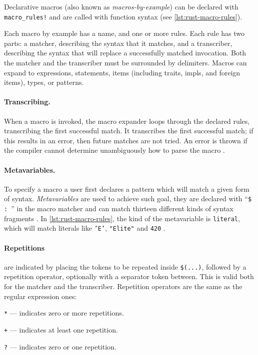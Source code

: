 Declarative macros (also known as \emph{macros-by-example}) can be declared with \texttt{macro\_rules!}
and are called with function syntax (see \autoref{lst:rust-macro-rules}).

\begin{displayquote}
	Each macro by example has a name, and one or more rules.
	Each rule has two parts: a matcher, describing the syntax that it matches, and a transcriber,
	describing the syntax that will replace a successfully matched invocation.
	Both the matcher and the transcriber must be surrounded by delimiters.
	Macros can expand to expressions, statements, items
	(including traits, impls, and foreign items), types, or patterns.
\end{displayquote}

\paragraph{Transcribing.}
When a macro is invoked, the macro expander loops through the declared rules, transcribing the first successful match.
It transcribes the first successful match; if this results in an error, then future matches are not tried.
An error is thrown if the compiler cannot determine unambiguously how to parse the macro
\autocite[Section 3.1 - Transcribing]{RustRef2021}.

\paragraph{Metavariables.}
To specify a macro a user first declares a pattern which will match a given form of syntax.
\emph{Metavariables} are used to achieve such goal,
they are declared with “\texttt{\$  : }” in the macro matcher and
can match thirteen different kinds of syntax fragments \autocite[Section 3.1 - Metavariables]{RustRef2021}.
In \autoref{lst:rust-macro-rules}, the kind of the  metavariable is \texttt{literal},
which will match literals like \texttt{'E'}, \texttt{"Elite"} and \texttt{420} \autocite[Section 8.2.1]{RustRef2021}.

\paragraph{Repetitions} are indicated by placing the tokens to be repeated inside \texttt{\$(...)},
followed by a repetition operator, optionally with a separator token between.
This is valid both for the matcher and the transcriber.
Repetition operators are the same as the regular expression ones:
\begin{compactitem}
	\item \texttt{*} — indicates zero or more repetitions.
	\item \texttt{+} — indicates at least one repetition.
	\item \texttt{?} — indicates zero or one repetition.
\end{compactitem}

